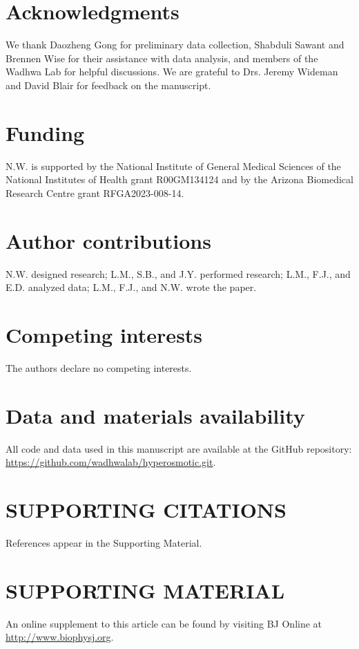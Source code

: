 \documentclass[twocolumn]{biophys-new}%
\begin{document}
\section*{Acknowledgments}
We thank Daozheng Gong for preliminary data collection, Shabduli Sawant and Brennen Wise for their assistance with data analysis, and members of the Wadhwa Lab for helpful discussions. We are grateful to Drs. Jeremy Wideman and David Blair for feedback on the manuscript.

\section*{Funding}
 N.W. is supported by the National Institute of General Medical Sciences of the National Institutes of Health grant R00GM134124 and by the Arizona Biomedical Research Centre grant RFGA2023-008-14.
 
\section*{Author contributions}
N.W. designed research; L.M., S.B., and J.Y. performed research; L.M., F.J., and E.D. analyzed data; L.M., F.J., and N.W. wrote the paper. 

\section*{Competing interests}
The authors declare no competing interests.

\section*{Data and materials availability}
All code and data used in this manuscript are available at the GitHub repository: \url{https://github.com/wadhwalab/hyperosmotic.git}.

\section*{SUPPORTING CITATIONS}
References \cite{swindells1958,Sahare2021} appear in the Supporting Material.

\section*{SUPPORTING MATERIAL}
An online supplement to this article can be found by visiting BJ 
Online at \url{http://www.biophysj.org}.


\end{document}
